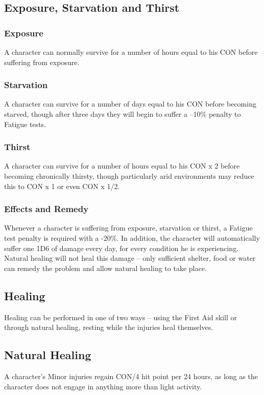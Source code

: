 \subsection{Exposure, Starvation and Thirst}

\subsubsection{Exposure}
A character can normally survive for a number of hours equal to his CON before suffering from exposure. 

\subsubsection{Starvation}
A character can survive for a number of days equal to his CON before becoming starved, though after three days they will begin to suffer a –10\% penalty to Fatigue tests. 

\subsubsection{Thirst}
A character can survive for a number of hours equal to his CON x 2 before becoming chronically thirsty, though particularly arid environments may reduce this to CON x 1 or even CON x 1/2. 

\subsubsection{Effects and Remedy}
Whenever a character is suffering from exposure, starvation or thirst, a Fatigue test penalty is required with a -20\%. In addition, the character will automatically suffer one 1D6 of damage every day, for every condition he is experiencing. Natural healing will not heal this damage – only sufficient shelter, food or water can remedy the problem and allow natural healing to take place. 


\subsection{Healing}
Healing can be performed in one of two ways – using the First Aid skill or through natural healing, resting while the injuries heal themselves. 

\subsection{Natural Healing}
A character’s Minor injuries regain CON/4 hit point per 24 hours, as long as the character does not engage in anything more than light activity. 

